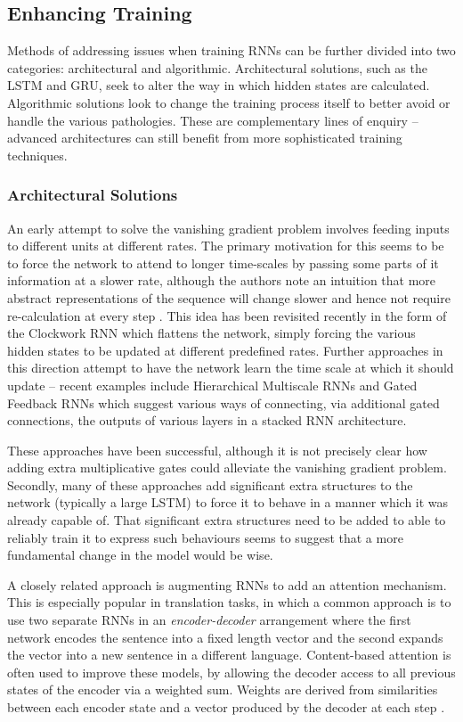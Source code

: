 \subsection{Enhancing Training}
Methods of addressing issues when training RNNs can be further divided into two categories:
architectural and algorithmic.
Architectural solutions, such as the LSTM and GRU, seek to alter
the way in which hidden states are calculated. Algorithmic solutions look to change the training
process itself to better avoid or handle the various pathologies. These are complementary lines of
enquiry -- advanced architectures can still benefit from more sophisticated training techniques.

\subsubsection{Architectural Solutions}
An early attempt to solve the vanishing gradient problem involves feeding inputs to different units
at different
rates. The primary motivation for this seems to be to force the network to attend to longer
time-scales by passing some parts of it information at a slower rate, although the authors note an
intuition that more abstract representations of the sequence will change slower and hence not
require re-calculation at every step \autocite{Hihi1995}. This idea has been revisited recently in
the form of the Clockwork RNN \autocite{Koutnik2014} which flattens the network, simply forcing
the various hidden states to be updated at different predefined rates. Further approaches in this
direction attempt to have the network learn the time scale at which it should update -- recent
examples include Hierarchical Multiscale RNNs \autocite{Chung2016} and Gated Feedback RNNs
\autocite{Chung2015} which suggest various ways of connecting, via additional gated connections,
the outputs of various layers in a stacked RNN architecture.

These approaches have been successful, although it is not precisely clear how adding extra
multiplicative gates could alleviate the vanishing gradient problem. Secondly, many of these
approaches add significant extra structures to the network (typically a large LSTM)
to force it to behave in a manner which
it was already capable of. That significant extra structures need to be added to able to reliably
train it to express such behaviours seems to suggest that a more fundamental change in the model
would be wise.

A closely related approach is augmenting RNNs to add an attention mechanism. This is especially
popular in translation tasks, in which a common approach is to use two separate RNNs in an
\emph{encoder-decoder} arrangement where the first network encodes the sentence into a fixed length
vector and the second expands the vector into a new sentence in a different language.
\autocite{Cho2014b, Luong2016} Content-based attention is often used to improve these models, 
by allowing the decoder access to all previous states of the encoder via a weighted sum. Weights
are derived from similarities between each encoder state and a vector produced by the decoder at
each step \autocite{Chan2015, Bahdanau2015}.

